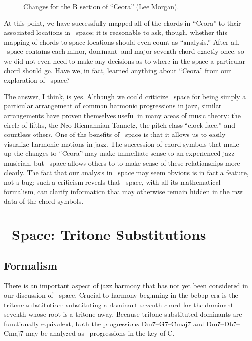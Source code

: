 \begin{figure}[htbp]
  \caption{Changes for the B section of ``Ceora'' (Lee Morgan).}
  \label{tf:ceora-changes-2}
\end{figure}

At this point, we have successfully mapped all of the chords in ``Ceora'' to
their associated locations in \tf\ space; it is reasonable to ask, though,
whether this mapping of chords to space locations should even count as
``analysis.'' After all, \tf\ space contains each minor, dominant, and major
seventh chord exactly once, so we did not even need to make any decisions as
to where in the space a particular chord should go. Have we, in fact, learned
anything about ``Ceora'' from our exploration of \tf\ space?

The answer, I think, is yes. Although we could criticize \tf\ space for being
simply a particular arrangement of common harmonic progressions in jazz,
similar arrangements have proven themselves useful in many areas of music
theory: the circle of fifths, the Neo-Riemannian Tonnetz, the pitch-class
``clock face,'' and countless others. One of the benefits of \tf\
space is that it allows us to easily visualize harmonic motions in jazz. The
succession of chord symbols that make up the changes to ``Ceora'' may make
immediate sense to an experienced jazz musician, but \tf\ space allows others
to to make sense of these relationships more clearly. The fact that our
analysis in \tf\ space may seem obvious is in fact a feature, not a bug; such
a criticism reveals that \tf\ space, with all its mathematical formalism,
can clarify information that may otherwise remain hidden in the raw data of
the chord symbols.\fn{tf-13}





\section{\tf\ Space: Tritone Substitutions}

\subsection{Formalism}

There is an important aspect of jazz harmony that has not yet been considered in
our discussion of \tf\ space. Crucial to harmony beginning in the bebop era is
the tritone substitution: substituting a dominant seventh chord for the
dominant seventh whose root is a tritone away.\fn{tft-1} Because
tritone-substituted dominants are functionally equivalent, both the
progressions \h{Dm7}--\h{G7}--\h{Cmaj7} and \h{Dm7}--\h{Db7}--\h{Cmaj7} may be
analyzed as \tfo\ progressions in the key of C.

